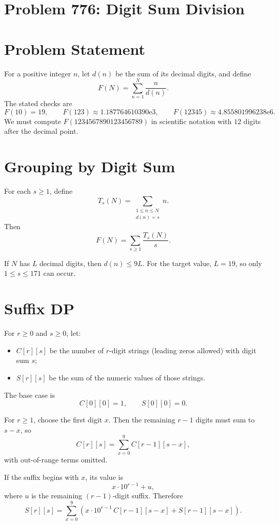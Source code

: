 \documentclass[11pt]{article}
\begin{document}
\section*{Problem 776: Digit Sum Division}

\section{Problem Statement}

For a positive integer $n$, let $d(n)$ be the sum of its decimal digits, and define
\[
F(N)=\sum_{n=1}^{N}\frac{n}{d(n)}.
\]
The stated checks are
\[
F(10)=19,\qquad
F(123)\approx 1.187764610390\mathrm e3,\qquad
F(12345)\approx 4.855801996238\mathrm e6.
\]
We must compute $F(1234567890123456789)$ in scientific notation with $12$ digits after the decimal point.

\section{Grouping by Digit Sum}

For each $s\ge 1$, define
\[
T_s(N)=\sum_{\substack{1\le n\le N\\ d(n)=s}} n.
\]
Then
\[
F(N)=\sum_{s\ge 1}\frac{T_s(N)}{s}.
\]

If $N$ has $L$ decimal digits, then $d(n)\le 9L$. For the target value, $L=19$, so only $1\le s\le 171$ can occur.

\section{Suffix DP}

For $r\ge 0$ and $s\ge 0$, let:
\begin{itemize}
\item $C[r][s]$ be the number of $r$-digit strings (leading zeros allowed) with digit sum $s$;
\item $S[r][s]$ be the sum of the numeric values of those strings.
\end{itemize}

The base case is
\[
C[0][0]=1,\qquad S[0][0]=0.
\]

For $r\ge 1$, choose the first digit $x$. Then the remaining $r-1$ digits must sum to $s-x$, so
\[
C[r][s]=\sum_{x=0}^{9} C[r-1][s-x],
\]
with out-of-range terms omitted.

If the suffix begins with $x$, its value is
\[
x\cdot 10^{r-1}+u,
\]
where $u$ is the remaining $(r-1)$-digit suffix. Therefore
\[
S[r][s]
=
\sum_{x=0}^{9}
\left(
x\cdot 10^{r-1}\, C[r-1][s-x] + S[r-1][s-x]
\right).
\]
\end{document}
